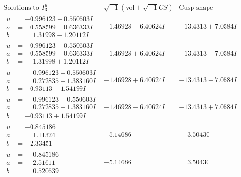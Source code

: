\documentclass[1p]{elsarticle_modified}
\theoremstyle{definition}
\newcommand{\I}{\sqrt{-1}}
\begin{document}
$$\begin{array}{c|c|c}  
\text{Solutions to }I^u_{3}& \I (\text{vol} + \sqrt{-1}CS) & \text{Cusp shape}\\
 \hline 
\begin{aligned}
u &= -0.996123 + 0.550603 I \\
a &= -0.558599 - 0.636333 I \\
b &= \phantom{-}1.31998 - 1.20112 I\end{aligned}
 & -1.46928 - 6.40624 I & -13.4313 + 7.0584 I \\ \hline\begin{aligned}
u &= -0.996123 - 0.550603 I \\
a &= -0.558599 + 0.636333 I \\
b &= \phantom{-}1.31998 + 1.20112 I\end{aligned}
 & -1.46928 + 6.40624 I & -13.4313 - 7.0584 I \\ \hline\begin{aligned}
u &= \phantom{-}0.996123 + 0.550603 I \\
a &= \phantom{-}0.272835 - 1.383160 I \\
b &= -0.93113 - 1.54199 I\end{aligned}
 & -1.46928 + 6.40624 I & -13.4313 - 7.0584 I \\ \hline\begin{aligned}
u &= \phantom{-}0.996123 - 0.550603 I \\
a &= \phantom{-}0.272835 + 1.383160 I \\
b &= -0.93113 + 1.54199 I\end{aligned}
 & -1.46928 - 6.40624 I & -13.4313 + 7.0584 I \\ \hline\begin{aligned}
u &= -0.845186\phantom{ +0.000000I} \\
a &= \phantom{-}1.11324\phantom{ +0.000000I} \\
b &= -2.33451\phantom{ +0.000000I}\end{aligned}
 & -5.14686\phantom{ +0.000000I} & \phantom{-}3.50430\phantom{ +0.000000I} \\ \hline\begin{aligned}
u &= \phantom{-}0.845186\phantom{ +0.000000I} \\
a &= \phantom{-}2.51611\phantom{ +0.000000I} \\
b &= \phantom{-}0.520639\phantom{ +0.000000I}\end{aligned}
 & -5.14686\phantom{ +0.000000I} & \phantom{-}3.50430\phantom{ +0.000000I} \\ \hline\begin{aligned}

\end{aligned}
\end{array}$$
\end{document}
